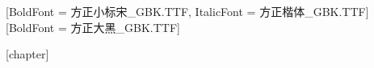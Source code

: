 \usepackage{ctex}
[BoldFont = {方正小标宋_GBK.TTF}, ItalicFont = {方正楷体_GBK.TTF}] 
[BoldFont = {方正大黑_GBK.TTF}] 

\usepackage{indentfirst}
\setlength{\parindent}{2em}

\makeatletter
\renewenvironment{proof}[1][\proofname]{\par
	\pushQED{\qed}
	\normalfont \topsep6\p@\@plus6\p@\relax
	\begin{itemize}[
		leftmargin    = 0em,
		itemindent    = 2em,
		labelsep      = 1em,
		listparindent = 2em
	]
		\item[\bfseries#1]
}{
	\popQED \end{itemize} \@endpefalse
}
\makeatother

\renewcommand{\proofname}{证}

\newenvironment{solution}{\begin{proof}[解]}{\end{proof}}

\newenvironment{analysis}{\begin{proof}[析]\let\qed\relax}{\end{proof}}

[chapter]

\def\questionautorefname{题}


\renewcommand{\theequation}{\arabic{question}.\arabic{equation}}

\newcommand{\source}[1]{\begin{flushright}(\textit{#1})\end{flushright}}

\theoremstyle{definition}\newtheorem{theorem}{定理}

\theoremstyle{definition}\newtheorem{axiom}[theorem]{公理}

\theoremstyle{definition}\newtheorem{rules}[theorem]{规则}

\theoremstyle{definition}\newtheorem{corollary}[theorem]{推论}